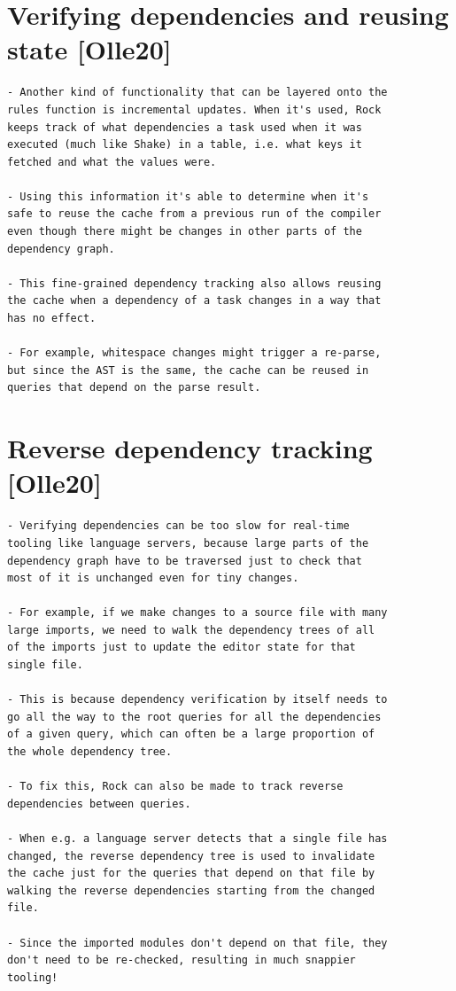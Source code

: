 \documentclass[12pt, a4paper]{report}
\begin{document}
\section*{Verifying dependencies and reusing state [Olle20]}

\begin{verbatim}
- Another kind of functionality that can be layered onto the
rules function is incremental updates. When it's used, Rock
keeps track of what dependencies a task used when it was
executed (much like Shake) in a table, i.e. what keys it
fetched and what the values were.

- Using this information it's able to determine when it's
safe to reuse the cache from a previous run of the compiler
even though there might be changes in other parts of the
dependency graph.

- This fine-grained dependency tracking also allows reusing
the cache when a dependency of a task changes in a way that
has no effect.

- For example, whitespace changes might trigger a re-parse,
but since the AST is the same, the cache can be reused in
queries that depend on the parse result.
\end{verbatim}
\cite{olle_query_based}

\section*{Reverse dependency tracking [Olle20]}

\begin{verbatim}
- Verifying dependencies can be too slow for real-time
tooling like language servers, because large parts of the
dependency graph have to be traversed just to check that
most of it is unchanged even for tiny changes.

- For example, if we make changes to a source file with many
large imports, we need to walk the dependency trees of all
of the imports just to update the editor state for that
single file.

- This is because dependency verification by itself needs to
go all the way to the root queries for all the dependencies
of a given query, which can often be a large proportion of
the whole dependency tree.

- To fix this, Rock can also be made to track reverse
dependencies between queries.

- When e.g. a language server detects that a single file has
changed, the reverse dependency tree is used to invalidate
the cache just for the queries that depend on that file by
walking the reverse dependencies starting from the changed
file.

- Since the imported modules don't depend on that file, they
don't need to be re-checked, resulting in much snappier
tooling!
\end{verbatim}
\cite{olle_query_based}
\end{document}
